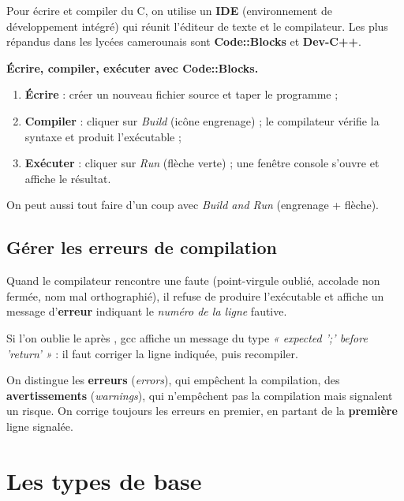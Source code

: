 Pour écrire et compiler du C, on utilise un \textbf{IDE} (environnement de
développement intégré) qui réunit l'éditeur de texte et le compilateur. Les plus
répandus dans les lycées camerounais sont \textbf{Code::Blocks} et
\textbf{Dev-C++}.

\begin{methode}
\textbf{Écrire, compiler, exécuter avec Code::Blocks.}
\begin{enumerate}[label=\arabic*)]
  \item \textbf{Écrire} : créer un nouveau fichier source  et taper le
    programme ;
  \item \textbf{Compiler} : cliquer sur \emph{Build} (icône engrenage) ; le
    compilateur vérifie la syntaxe et produit l'exécutable ;
  \item \textbf{Exécuter} : cliquer sur \emph{Run} (flèche verte) ; une fenêtre
    console s'ouvre et affiche le résultat.
\end{enumerate}
On peut aussi tout faire d'un coup avec \emph{Build and Run} (engrenage + flèche).
\end{methode}

\subsection{Gérer les erreurs de compilation}

Quand le compilateur rencontre une faute (point-virgule oublié, accolade non
fermée, nom mal orthographié), il refuse de produire l'exécutable et affiche un
message d'\textbf{erreur} indiquant le \emph{numéro de la ligne} fautive.

\begin{exemple}
Si l'on oublie le \code{;} après , gcc affiche un message
du type \emph{« expected ';' before 'return' »} : il faut corriger la ligne
indiquée, puis recompiler.
\end{exemple}

\begin{remarque}
On distingue les \textbf{erreurs} (\emph{errors}), qui empêchent la compilation,
des \textbf{avertissements} (\emph{warnings}), qui n'empêchent pas la compilation
mais signalent un risque. On corrige toujours les erreurs en premier, en partant
de la \textbf{première} ligne signalée.
\end{remarque}

\section{Les types de base}

